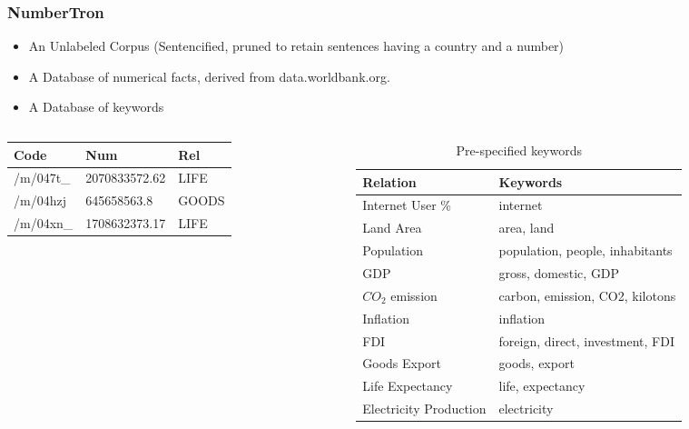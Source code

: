 \documentclass{beamer}
\begin{document}
\begin{frame}
\frametitle{NumberTron}
\begin{itemize}
 \item An Unlabeled Corpus (Sentencified, pruned to retain sentences having a country and a number)
 \item A Database of numerical facts, derived from data.worldbank.org.
 \item A Database of keywords
\end{itemize}
\begin{columns}[T] %
\begin{column}{.48\textwidth}
\begin{adjustbox}{max width=\textwidth}
\begin{tabular}{|l|l|l|}
\hline
 Code & Num & Rel \\
\hline
/m/047t\_&2070833572.62&LIFE \\
/m/04hzj&645658563.8&GOODS \\
/m/04xn\_&1708632373.17&LIFE \\
\hline
\end{tabular}
\end{adjustbox}
\end{column}%
\hfill%
\begin{column}{.48\textwidth}
\begin{table}
\begin{adjustbox}{max width=\textwidth}
\begin{tabular}{|l|l|}
\hline 
 Relation & Keywords\\
\hline
 Internet User \% &internet\\
Land Area &area, land\\
Population &population, people, inhabitants\\
GDP & gross, domestic, GDP\\
$CO_2$ emission & carbon, emission, CO2, kilotons\\
Inflation & inflation\\
FDI &foreign, direct, investment, FDI\\
Goods Export & goods, export\\
Life Expectancy & life, expectancy\\
Electricity Production & electricity\\
\hline
\end{tabular}
\end{adjustbox}
\caption{Pre-specified keywords}
\label{table:keywords}
\end{table}
\end{column}%

\end{columns}

\end{frame}
\end{document}
